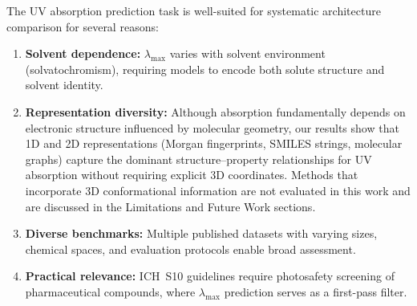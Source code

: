 \documentclass[journal=jcisd8,manuscript=article]{achemso}
\begin{document}
The UV absorption prediction task is well-suited for systematic architecture comparison for several reasons:
\begin{enumerate}
 \item \textbf{Solvent dependence:} $\lambda_{\max}$ varies with solvent environment (solvatochromism), requiring models to encode both solute structure and solvent identity.
 \item \textbf{Representation diversity:} Although absorption fundamentally depends on electronic structure influenced by molecular geometry, our results show that 1D and 2D representations (Morgan fingerprints, SMILES strings, molecular graphs) capture the dominant structure--property relationships for UV absorption without requiring explicit 3D coordinates. Methods that incorporate 3D conformational information are not evaluated in this work and are discussed in the Limitations and Future Work sections.
 \item \textbf{Diverse benchmarks:} Multiple published datasets with varying sizes, chemical spaces, and evaluation protocols enable broad assessment.
 \item \textbf{Practical relevance:} ICH~S10 guidelines require photosafety screening of pharmaceutical compounds, where $\lambda_{\max}$ prediction serves as a first-pass filter.
\end{enumerate}
\end{document}
